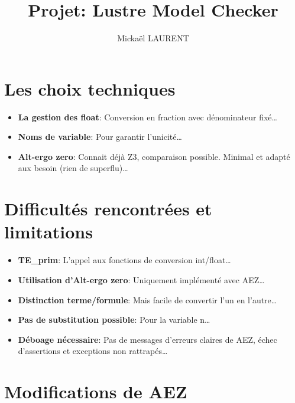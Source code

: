 \documentclass[a4paper]{article}%
\title{\vspace{1.5cm}Projet: Lustre Model Checker}
\author{Mickaël LAURENT}
\date{\vspace{-5ex}}
\begin{document}
    \maketitle

    \section{Les choix techniques}
		
	\begin{itemize}
		\item \textbf{La gestion des float}: Conversion en fraction avec dénominateur fixé\ldots
		\item \textbf{Noms de variable}: Pour garantir l'unicité\ldots
		\item \textbf{Alt-ergo zero}: Connait déjà Z3, comparaison possible. Minimal et adapté aux besoin (rien de superflu)\ldots
	\end{itemize}

	\section{Difficultés rencontrées et limitations}

	\begin{itemize}
		\item \textbf{TE\_prim}: L'appel aux fonctions de conversion int/float\ldots
		\item \textbf{Utilisation d'Alt-ergo zero}: Uniquement implémenté avec AEZ\ldots
		\item \textbf{Distinction terme/formule}: Mais facile de convertir l'un en l'autre\ldots
		\item \textbf{Pas de substitution possible}: Pour la variable n\ldots
		\item \textbf{Déboage nécessaire}: Pas de messages d'erreurs claires de AEZ, échec d'assertions et exceptions non rattrapés\ldots
	\end{itemize}

	\section{Modifications de AEZ}
		
\end{document}

